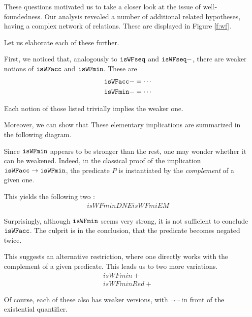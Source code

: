 These questions motivated us to take a closer look at the issue of well-foundedness.
Our analysis revealed a number of additional related hypotheses, having a complex
network of relations.  These are displayed in Figure \ref{f:wf}.

Let us elaborate each of these further.

First, we noticed that, analogously to $\mathtt{isWFseq}$ and $\mathtt{isWFseq-}$, there are weaker notions of
$\mathtt{isWFacc}$ and $\mathtt{isWFmin}$.  These are
\begin{align*}
\mathtt{isWFacc-} &= \cdots \\
\mathtt{isWFmin-} &= \cdots \\
\end{align*}

Each notion of those listed trivially implies the weaker one.

Moreover, we can show that 
These elementary implications are summarized in the following diagram.


Since $\mathtt{isWFmin}$ appears to be stronger than the rest, one may wonder whether
it can be weakened.  Indeed, in the classical proof of the implication
$\mathtt{isWFacc} \to \mathtt{isWFmin}$, the predicate $P$ is instantiated by the \emph{complement}
of a given one.

This yields the following two :
  \begin{align*}
    isWFminDNE
    isWFmiEM
  \end{align*}

Surprisingly, although $\mathtt{isWFmin}$ seems very strong, it is not sufficient to
conclude $\mathtt{isWFacc}$.  The culprit is in the conclusion, that the predicate becomes
negated twice.

This suggests an alternative restriction, where one directly works with the
complement of a given predicate.  This leads us to two more variations.
\begin{align*}
  isWFmin+\\
  isWFminRed+
\end{align*}

Of course, each of these also has weaker versions,
with $\lnot\lnot$ in front of the existential quantifier.


